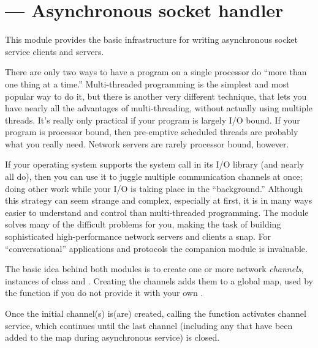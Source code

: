 \section{ ---
         Asynchronous socket handler}


This module provides the basic infrastructure for writing asynchronous 
socket service clients and servers.

There are only two ways to have a program on a single processor do 
``more than one thing at a time.'' Multi-threaded programming is the 
simplest and most popular way to do it, but there is another very 
different technique, that lets you have nearly all the advantages of 
multi-threading, without actually using multiple threads.  It's really 
only practical if your program is largely I/O bound.  If your program 
is processor bound, then pre-emptive scheduled threads are probably what 
you really need. Network servers are rarely processor bound, however.

If your operating system supports the  system call 
in its I/O library (and nearly all do), then you can use it to juggle 
multiple communication channels at once; doing other work while your 
I/O is taking place in the ``background.''  Although this strategy can 
seem strange and complex, especially at first, it is in many ways 
easier to understand and control than multi-threaded programming.  
The  module solves many of the difficult problems for 
you, making the task of building sophisticated high-performance 
network servers and clients a snap. For ``conversational'' applications
and protocols the companion   module is invaluable.

The basic idea behind both modules is to create one or more network
\emph{channels}, instances of class  and
. Creating the channels adds them to a global
map, used by the  function if you do not provide it
with your own .

Once the initial channel(s) is(are) created, calling the 
function activates channel service, which continues until the last
channel (including any that have been added to the map during asynchronous
service) is closed.

